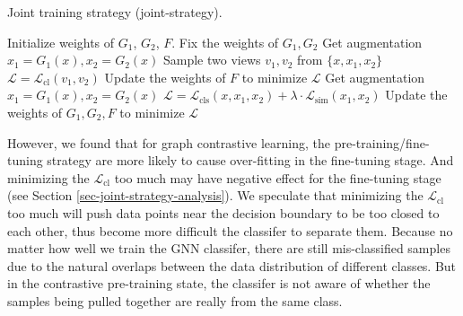 \begin{algorithm}[tb]
    \begin{small}
        \caption{Joint training strategy (joint-strategy).}
        \begin{algorithmic}[1]
            \State Initialize weights of $G_1$, $G_2$, $F$.
                    \State Fix the weights of $G_1, G_2$
                    \State Get augmentation $x_1 = G_1(x), x_2 = G_2(x)$
                    \State Sample two views $v_1, v_2$ from $\{x, x_1, x_2\}$
                    \State $\mathcal{L} = \mathcal{L}_{\text{cl}} (v_1, v_2)$
                    \State Update the weights of $F$ to minimize $\mathcal{L}$
                \EndFor
                    \State Get augmentation $x_1 = G_1(x), x_2 = G_2(x)$
                    \State $\mathcal{L} = \mathcal{L}_{\text{cls}}(x, x_1, x_2) + \lambda \cdot \mathcal{L}_{\text{sim}}(x_1, x_2)$
                    \State Update the weights of $G_1, G_2, F$ to minimize $\mathcal{L}$
                \EndFor
            \EndWhile
        \end{algorithmic}
        \label{algo-joint}
    \end{small}
\vspace{-0.1cm}
\end{algorithm}
However, we found that for graph contrastive learning, the pre-training/fine-tuning strategy are more likely to cause over-fitting in the fine-tuning stage. And minimizing the $\mathcal{L}_{\text{cl}}$ too much may have negative effect for the fine-tuning stage (see Section \ref{sec-joint-strategy-analysis}). We speculate that minimizing the $\mathcal{L}_{\text{cl}}$ too much will push data points near the decision boundary to be too closed to each other, thus become more difficult the classifer to separate them. Because no matter how well we train the GNN classifer, there are still mis-classified samples due to the natural overlaps between the data distribution of different classes. But in the contrastive pre-training state, the classifer is not aware of whether the samples being pulled together are really from the same class.

